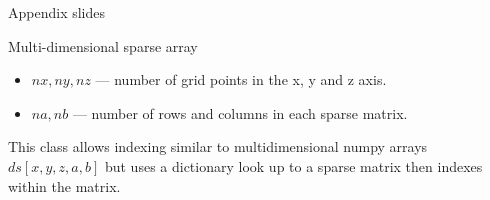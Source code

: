 \documentclass[8pt]{beamer}
\begin{document}
\begin{frame}{Appendix slides}
\end{frame}

\begin{frame}{Multi-dimensional sparse array}
\begin{block}{}
\begin{minipage}{0.8\linewidth}
\DictionarySparse
\end{minipage}
\begin{minipage}{0.17\linewidth}
\begin{itemize}
\item
\textbf{$nx, ny, nz$} --- number of grid points in the x, y and z axis.
\item \textbf{$na, nb$} --- number of rows and columns in each sparse matrix.
\end{itemize}
\end{minipage}
This class allows indexing similar to multidimensional numpy arrays \textbf{$ds[x,y,z,a,b]$} but uses a dictionary look up to a sparse matrix then indexes within the matrix.
\end{block}

\end{frame}
\end{document}
